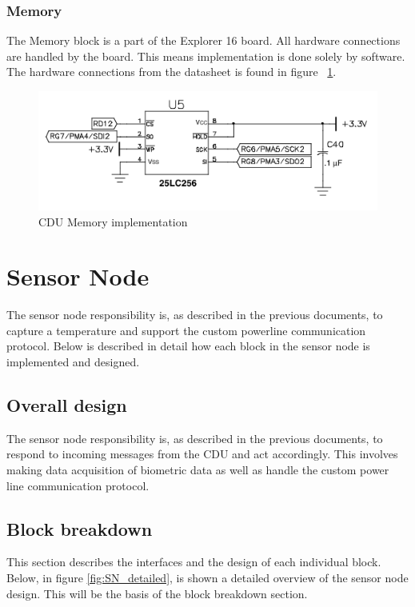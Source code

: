 \subsubsection{Memory}
The Memory block is a part of the Explorer 16 board. All hardware connections are handled by the board. This means implementation is done solely by software. The hardware connections from the datasheet is found in figure ~\ref{fig:CDUimpm}.
\begin{figure}[H]
	\centering
	\includegraphics[scale=0.7]{billeder/impm}
	\caption{CDU Memory implementation}
	\label{fig:CDUimpm}
\end{figure}

\newpage

\section{Sensor Node}
The sensor node responsibility is, as described in the previous documents, to capture a temperature and support the custom powerline communication protocol. Below is described in detail how each block in the sensor node is implemented and designed.

\subsection{Overall design}
The sensor node responsibility is, as described in the previous documents, to respond to incoming messages from the CDU and act accordingly. This involves making data acquisition of biometric data as well as handle the custom power line communication protocol.

\subsection{Block breakdown}
This section describes the interfaces and the design of each individual block.\\
Below, in figure \ref{fig:SN_detailed}, is shown a detailed overview of the sensor node design. This will be the basis of the block breakdown section.

